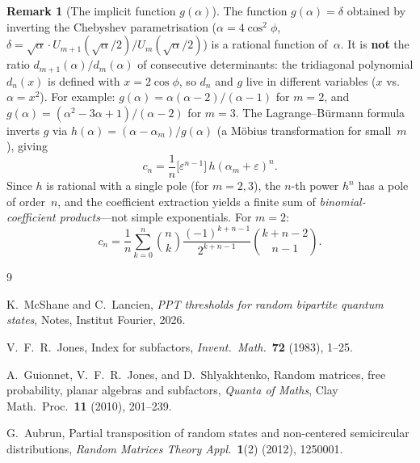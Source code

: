 \documentclass[11pt,a4paper]{article}
\theoremstyle{plain}
\theoremstyle{definition}
\newtheorem{remark}[theorem]{Remark}
\begin{document}
\begin{remark}[The implicit function $g(\alpha)$]
\label{rem:g-function}
The function $g(\alpha) = \delta$ obtained by inverting the Chebyshev
parametrisation ($\alpha = 4\cos^2\!\phi$, $\delta = \sqrt{\alpha}
\cdot U_{m+1}(\sqrt{\alpha}/2) / U_m(\sqrt{\alpha}/2)$) is a rational
function of~$\alpha$.  It is \textbf{not} the ratio $d_{m+1}(\alpha)
/ d_m(\alpha)$ of consecutive determinants: the tridiagonal polynomial
$d_n(x)$ is defined with $x = 2\cos\phi$, so $d_n$ and $g$ live in
different variables ($x$ vs.\ $\alpha = x^2$).  For example:
$g(\alpha) = \alpha(\alpha{-}2)/(\alpha{-}1)$ for $m=2$,
and $g(\alpha) = (\alpha^2{-}3\alpha{+}1)/(\alpha{-}2)$ for $m=3$.
The Lagrange--B\"urmann formula inverts $g$ via
$h(\alpha) = (\alpha{-}\alpha_m)/g(\alpha)$ (a M\"obius transformation
for small~$m$), giving
\[
  c_n = \frac{1}{n}\bigl[\varepsilon^{n-1}\bigr]\,
  h(\alpha_m + \varepsilon)^n.
\]
Since $h$ is rational with a single pole (for $m = 2, 3$), the $n$-th
power $h^n$ has a pole of order~$n$, and the coefficient extraction
yields a finite sum of \emph{binomial-coefficient products}---not
simple exponentials.  For $m=2$:
\[
  c_n = \frac{1}{n}\sum_{k=0}^{n}\binom{n}{k}
  \frac{(-1)^{k+n-1}}{2^{k+n-1}}\binom{k+n-2}{n-1}.
\]
\end{remark}


\begin{thebibliography}{9}

K.~McShane and C.~Lancien,
\emph{PPT thresholds for random bipartite quantum states},
Notes, Institut Fourier, 2026.

V.~F.~R.~Jones,
Index for subfactors,
\emph{Invent.\ Math.}\ \textbf{72} (1983), 1--25.

A.~Guionnet, V.~F.~R.~Jones, and D.~Shlyakhtenko,
Random matrices, free probability, planar algebras and subfactors,
\emph{Quanta of Maths}, Clay Math.\ Proc.\ \textbf{11} (2010), 201--239.

G.~Aubrun,
Partial transposition of random states and non-centered semicircular
distributions,
\emph{Random Matrices Theory Appl.}\ \textbf{1}(2) (2012), 1250001.

\end{thebibliography}
\end{document}
